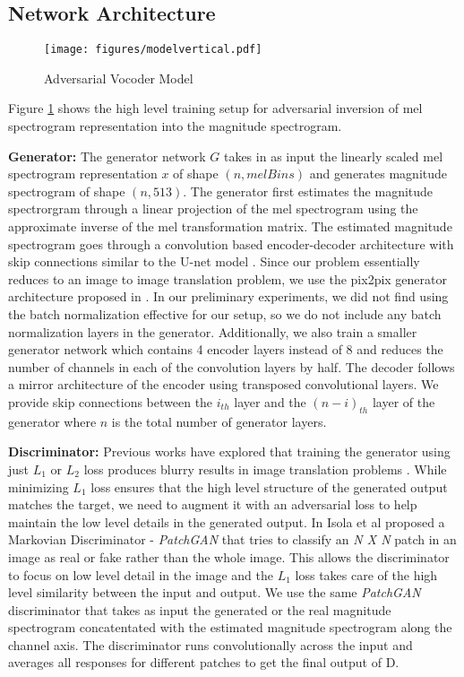 \documentclass[a4paper]{article}
\begin{document}
\subsection{Network Architecture}

\begin{figure}[htbp]
    \centering
    \texttt{[image: figures/modelvertical.pdf]}
    \caption{Adversarial Vocoder Model}
    \label{fig:model}
\end{figure}

Figure \ref{fig:model} shows the high level training setup for adversarial inversion of mel spectrogram representation into the magnitude spectrogram.

\textbf{Generator:} The generator network $G$ takes in as input the linearly scaled mel spectrogram representation $x$ of shape $(n, \mathit{melBins})$ and generates magnitude spectrogram of shape $(n, 513)$. The generator first estimates the magnitude spectrorgram through a linear projection of the mel spectrogram using the approximate inverse of the mel transformation matrix. The estimated magnitude spectrogram goes through a convolution based encoder-decoder architecture with skip connections similar to the U-net model \cite{unet}. Since our problem essentially reduces to an image to image translation problem, we use the pix2pix generator architecture proposed in \cite{pix2pix}. In our preliminary experiments, we did not find using the batch normalization effective for our setup, so we do not include any batch normalization layers in the generator. Additionally, we also train a smaller generator network which contains 4 encoder layers instead of 8 and reduces the number of channels in each of the convolution layers by half. The decoder follows a mirror architecture of the encoder using transposed convolutional layers. We provide skip connections between the $i_{th}$ layer and the $(n-i)_{th}$ layer of the generator where $n$ is the total number of generator layers.

\textbf{Discriminator:} Previous works have explored that training the generator using just $L_1$ or $L_2$ loss produces blurry results in image translation problems \cite{pathakCVPR16context,zhang2016colorful}. While minimizing $L_1$ loss ensures that the high level structure of the generated output matches the target, we need to augment it with an adversarial loss to help maintain the low level details in the generated output.
In \cite{pix2pix} Isola et al proposed a Markovian Discriminator - \textit{PatchGAN}  that tries to classify an \textit{N X N}  patch in an image as real or fake rather than the whole image. This allows the discriminator to focus on low level detail in the image and the $L_1$ loss takes care of the high level similarity between the input and output. We use the same \textit{PatchGAN} discriminator that takes as input the generated or the real magnitude spectrogram concatentated with the estimated magnitude spectrogram along the channel axis. The discriminator runs convolutionally across the input and averages all responses for different patches to get the final output of D.
\end{document}
